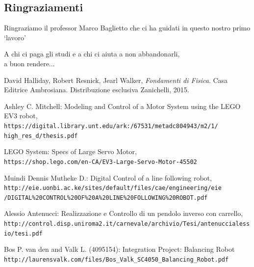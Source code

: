 \documentclass[a4paper,11pt,twoside]{book}
\makeatletter
\renewcommand{\frontmatter}{%
	\cleardoublepage\@mainmatterfalse 
	\pagenumbering{smallRoman}}
\makeatother
\begin{document}
\vfill


\newpage\null\thispagestyle{empty}\newpage

\frontmatter
\thispagestyle{empty}
\null{}
\begin{center}
	\section*{Ringraziamenti}
		Ringraziamo il professor Marco Baglietto che ci ha guidati in questo nostro primo `lavoro'
\end{center}
\null
\newpage
\begin{flushright}
	\null{}
	A chi ci paga gli studi e a chi ci aiuta a non abbandonarli,\\ a buon rendere...
	\null
\end{flushright}

\tableofcontents
\listoffigures
\listoftables
\mainmatter






\begin{thebibliography}{9}

	
	David Halliday, Robert Resnick, Jearl Walker, 
	\textit{Fondamenti di Fisica}. 
	Casa Editrice Ambrosiana. Distribuzione esclusiva Zanichelli, 2015.
	
	Ashley C. Mitchell: Modeling and Control of a Motor System using the LEGO EV3 robot,
	\\\texttt{https://digital.library.unt.edu/ark:/67531/metadc804943/m2/1/\\
		high\_res\_d/thesis.pdf}
	
	LEGO System: Specs of Large Servo Motor,
	\\\texttt{https://shop.lego.com/en-CA/EV3-Large-Servo-Motor-45502}
	
	Muindi Dennis Mutheke D.: Digital Control of a line following robot,
	\\\texttt{http://eie.uonbi.ac.ke/sites/default/files/cae/engineering/eie\\/DIGITAL\%20CONTROL\%20OF\%20A\%20LINE\%20FOLLOWING\%20ROBOT.pdf}
	
	Alessio Antenucci: Realizzazione e Controllo di un pendolo inverso con carrello,
	\\\texttt{http://control.disp.uniroma2.it/carnevale/archivio/Tesi/antenuccialessio/tesi.pdf}
	
	Bos P. van den and Valk L. (4095154): Integration Project: Balancing Robot
	\\\texttt{http://laurensvalk.com/files/Bos\_Valk\_SC4050\_Balancing\_Robot.pdf}

	
	
	
\end{thebibliography}
\end{document}
